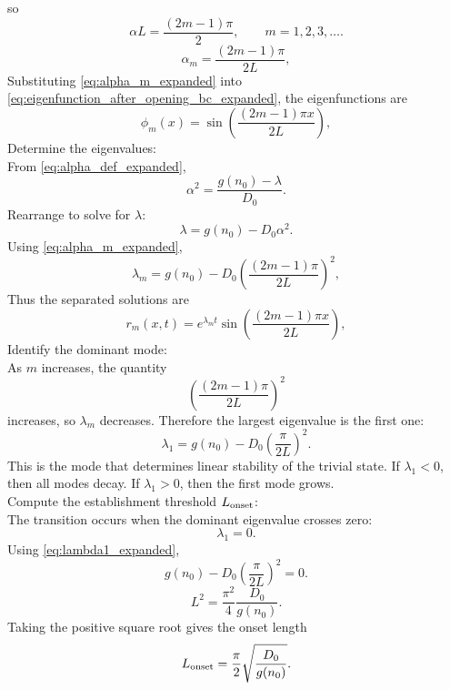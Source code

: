 \documentclass[11pt,a4paper]{report}
\begin{document}
	so
	\begin{equation}
		\alpha L=\frac{(2m-1)\pi}{2},
		\qquad
		m=1,2,3,\ldots.
		\label{eq:alpha_quantization_expanded}
	\end{equation}
	\begin{equation}
		\alpha_m=\frac{(2m-1)\pi}{2L},
		\label{eq:alpha_m_expanded}
	\end{equation}
	Substituting \eqref{eq:alpha_m_expanded} into \eqref{eq:eigenfunction_after_opening_bc_expanded}, the eigenfunctions are
	\begin{equation}
		\phi_m(x)
		=
		\sin\!\left(\frac{(2m-1)\pi x}{2L}\right),
		\label{eq:eigenfunctions_expanded}
	\end{equation}
	Determine the eigenvalues:\\
	From \eqref{eq:alpha_def_expanded},
	\[
	\alpha^2=\frac{g(n_0)-\lambda}{D_0}.
	\]
	Rearrange to solve for $\lambda$:
	\[
	\lambda=g(n_0)-D_0\alpha^2.
	\]
	Using \eqref{eq:alpha_m_expanded},
	\begin{equation}
		\lambda_m
		=
		g(n_0)
		-
		D_0\left(\frac{(2m-1)\pi}{2L}\right)^2,
		\label{eq:eigenvalues_expanded}
	\end{equation}
	Thus the separated solutions are
	\begin{equation}
		r_m(x,t)
		=
		e^{\lambda_m t}
		\sin\!\left(\frac{(2m-1)\pi x}{2L}\right),
	\end{equation}
	Identify the dominant mode:\\
	As $m$ increases, the quantity
	\[
	\left(\frac{(2m-1)\pi}{2L}\right)^2
	\]
	increases, so $\lambda_m$ decreases.  Therefore the largest eigenvalue is the first one:
	\begin{equation}
		\lambda_1
		=
		g(n_0)-D_0\left(\frac{\pi}{2L}\right)^2.
		\label{eq:lambda1_expanded}
	\end{equation}
	This is the mode that determines linear stability of the trivial state.  If $\lambda_1<0$, then all modes decay.  If $\lambda_1>0$, then the first mode grows.\\
	Compute the establishment threshold $L_{\rm onset}$:\\
	The transition occurs when the dominant eigenvalue crosses zero:
	\[
	\lambda_1=0.
	\]
	Using \eqref{eq:lambda1_expanded},
	\[
	g(n_0)-D_0\left(\frac{\pi}{2L}\right)^2=0.
	\]
	\[
	L^2=\frac{\pi^2}{4}\frac{D_0}{g(n_0)}.
	\]
	Taking the positive square root gives the onset length
	\begin{equation}
		L_{\rm onset}
		=
		\frac{\pi}{2}\sqrt{\frac{D_0}{g(n_0)}}.
		\label{eq:L_onset_expanded}
	\end{equation}
\end{document}
